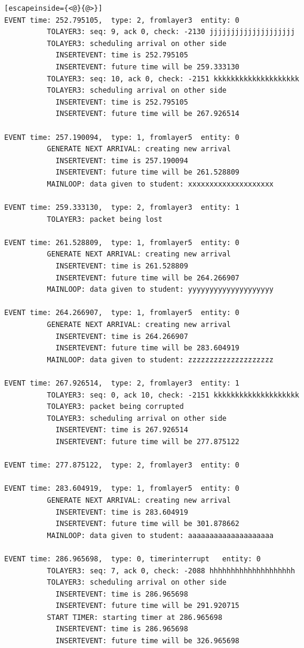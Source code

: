 \documentclass[paper=a4, fontsize=11pt]{scrartcl}
\numberwithin{equation}{section}		%
\numberwithin{figure}{section}			%
\numberwithin{table}{section}				%
\begin{document}
\begin{lstlisting}[escapeinside={<@}{@>}]
EVENT time: 252.795105,  type: 2, fromlayer3  entity: 0
          TOLAYER3: seq: 9, ack 0, check: -2130 jjjjjjjjjjjjjjjjjjjj
          TOLAYER3: scheduling arrival on other side
            INSERTEVENT: time is 252.795105
            INSERTEVENT: future time will be 259.333130
          TOLAYER3: seq: 10, ack 0, check: -2151 kkkkkkkkkkkkkkkkkkkk
          TOLAYER3: scheduling arrival on other side
            INSERTEVENT: time is 252.795105
            INSERTEVENT: future time will be 267.926514

EVENT time: 257.190094,  type: 1, fromlayer5  entity: 0
          GENERATE NEXT ARRIVAL: creating new arrival
            INSERTEVENT: time is 257.190094
            INSERTEVENT: future time will be 261.528809
          MAINLOOP: data given to student: xxxxxxxxxxxxxxxxxxxx

EVENT time: 259.333130,  type: 2, fromlayer3  entity: 1
          TOLAYER3: packet being lost

EVENT time: 261.528809,  type: 1, fromlayer5  entity: 0
          GENERATE NEXT ARRIVAL: creating new arrival
            INSERTEVENT: time is 261.528809
            INSERTEVENT: future time will be 264.266907
          MAINLOOP: data given to student: yyyyyyyyyyyyyyyyyyyy

EVENT time: 264.266907,  type: 1, fromlayer5  entity: 0
          GENERATE NEXT ARRIVAL: creating new arrival
            INSERTEVENT: time is 264.266907
            INSERTEVENT: future time will be 283.604919
          MAINLOOP: data given to student: zzzzzzzzzzzzzzzzzzzz

EVENT time: 267.926514,  type: 2, fromlayer3  entity: 1
          TOLAYER3: seq: 0, ack 10, check: -2151 kkkkkkkkkkkkkkkkkkkk
          TOLAYER3: packet being corrupted
          TOLAYER3: scheduling arrival on other side
            INSERTEVENT: time is 267.926514
            INSERTEVENT: future time will be 277.875122

EVENT time: 277.875122,  type: 2, fromlayer3  entity: 0

EVENT time: 283.604919,  type: 1, fromlayer5  entity: 0
          GENERATE NEXT ARRIVAL: creating new arrival
            INSERTEVENT: time is 283.604919
            INSERTEVENT: future time will be 301.878662
          MAINLOOP: data given to student: aaaaaaaaaaaaaaaaaaaa

EVENT time: 286.965698,  type: 0, timerinterrupt   entity: 0
          TOLAYER3: seq: 7, ack 0, check: -2088 hhhhhhhhhhhhhhhhhhhh
          TOLAYER3: scheduling arrival on other side
            INSERTEVENT: time is 286.965698
            INSERTEVENT: future time will be 291.920715
          START TIMER: starting timer at 286.965698
            INSERTEVENT: time is 286.965698
            INSERTEVENT: future time will be 326.965698


\end{lstlisting}
\end{document}
